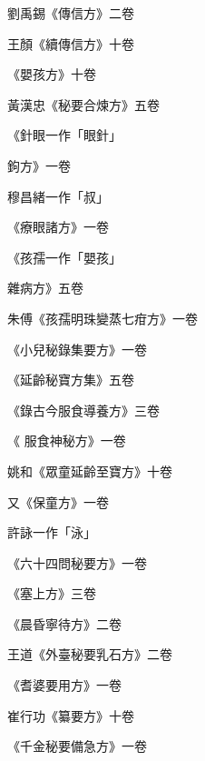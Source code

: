 \begin{pinyinscope}
 劉禹錫《傳信方》二卷



 王顏《續傳信方》十卷



 《嬰孩方》十卷



 黃漢忠《秘要合煉方》五卷



 《針眼一作「眼針」



 鉤方》一卷



 穆昌緒一作「叔」



 《療眼諸方》一卷



 《孩孺一作「嬰孩」



 雜病方》五卷



 朱傅《孩孺明珠變蒸七疳方》一卷



 《小兒秘錄集要方》一卷



 《延齡秘寶方集》五卷



 《錄古今服食導養方》三卷



 《
 服食神秘方》一卷



 姚和《眾童延齡至寶方》十卷



 又《保童方》一卷



 許詠一作「泳」



 《六十四問秘要方》一卷



 《塞上方》三卷



 《晨昏寧待方》二卷



 王道《外臺秘要乳石方》二卷



 《耆婆要用方》一卷



 崔行功《纂要方》十卷



 《千金秘要備急方》一卷




\end{pinyinscope}
